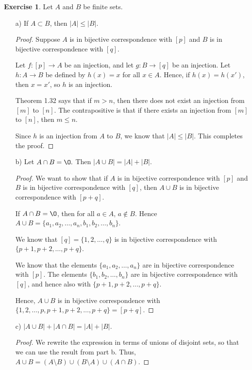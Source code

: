 \documentclass[11pt]{article}
\renewcommand{\emptyset}{\O}
\theoremstyle{definition}
\newtheorem{exercise}[theorem]{Exercise}
\numberwithin{equation}{subsection}
\begin{document}
\begin{exercise}
Let $A$ and $B$ be finite sets. 
\begin{enumerate}
\item[a)]
 If $A\subset B$, then $|A|\leq |B|$.
\begin{proof}
Suppose $A$ is in bijective correspondence with $[p]$ and $B$ is in bijective correspondence with $[q]$.

Let $f\colon [p] \rightarrow A$ be an injection, and let $g \colon B \rightarrow [q]$ be an injection. Let $h \colon A \rightarrow B$ be defined by $h(x)=x$ for all $x \in A$. Hence, if $h(x)=h(x')$, then $x=x'$, so $h$ is an injection.

Theorem 1.32 says that if $m > n$, then there does not exist an injection from $[m]$ to $[n]$. The contrapositive is that if there exists an injection from $[m]$ to $[n]$, then $m \leq n$.

Since $h$ is an injection from $A$ to $B$, we know that $|A| \leq |B|$. This completes the proof.

\renewcommand\qedsymbol{QED}
\end{proof}
 
\item[b)]
Let  $A\cap B=\emptyset.$ Then $|A\cup B|=|A|+|B|.$ 
\begin{proof}

We want to show that if $A$ is in bijective correspondence with $[p]$ and $B$ is in bijective correspondence with $[q]$, then $A \cup B$ is in bijective correspondence with $[p+q]$.

If $A \cap B = \emptyset$, then for all $a \in A$, $a \notin B$. Hence $A \cup B = \{a_1, a_2, \dots, a_n, b_1, b_2, \dots, b_n\}$. 

We know that $[q] = \{1, 2, \dots, q\}$ is in bijective correspondence with $\{p+1, p+2, \dots, p+q\}$. 

We know that the elements $\{a_1, a_2, \dots, a_n\}$ are in bijective correspondence with $[p]$. The elements $\{b_1, b_2, \dots, b_n\}$ are in bijective correspondence with $[q]$, and hence also with $\{p+1, p+2, \dots, p+q\}$. 

Hence, $A \cup B$ is in bijective correspondence with $\{1, 2, \dots, p, p+1, p+2, \dots, p+q\}=[p+q]$.

\renewcommand\qedsymbol{QED}
\end{proof}
\item[c)] 
$|A\cup B|+|A\cap B|=|A|+|B|$.
\begin{proof}
We rewrite the expression in terms of unions of disjoint sets, so that we can use the result from part b. Thus, $A\cup B = (A\setminus B) \cup (B \setminus A) \cup (A\cap B)$.


\end{proof}
\end{enumerate}
\end{exercise}
\end{document}
